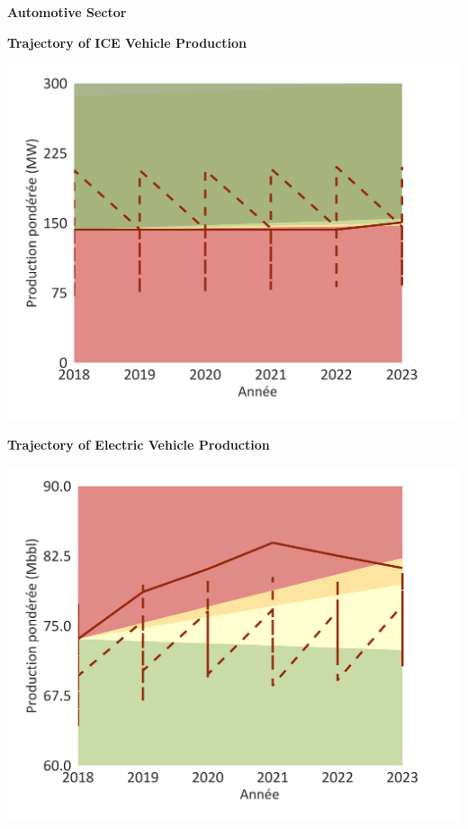 \documentclass[10pt,table,a4]{article}\usepackage[]{graphicx}\usepackage[]{color}
\begin{document}
	
	\begin{center}
		\textbf{Automotive Sector}
	\end{center}
	
	\begin{minipage}[t]{.49\linewidth}
		\textbf{Trajectory of ICE Vehicle Production}
		
		\includegraphics[trim = {0 0cm 0 0},width=1\linewidth]{ReportOutputs/Fig20}
		
	\end{minipage}	
	\hspace{.02\linewidth}
	\begin{minipage}[t]{.49\textwidth}
		\textbf{Trajectory of Electric Vehicle Production}
		
		\includegraphics[trim = {0 0cm 0 0},width=1\linewidth]{ReportOutputs/Fig21}
		
	\end{minipage}		
	
\end{document}
